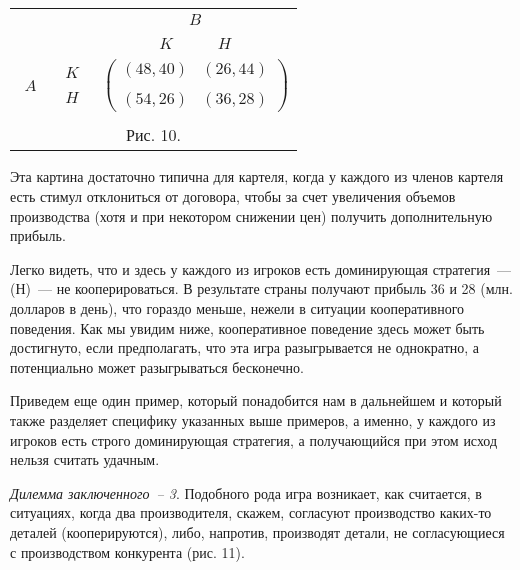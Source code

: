 \begin{center}
\begin{tabular}{ccc}
&&$\begin{array}{c} B\end{array}$\\
&&$\begin{array}{cc}  K\quad &\quad H \end{array}$\\
$\begin{array}{c} \\ A \\ \end{array}$& $\begin{array}{c} K\\ \\ H
\end{array}$&
$\left(\begin{array}{cc} (48,40)& (26,44)\\
\\
(54,26)&(36,28)\end{array}\right)$\\
\multicolumn{3}{c}{}\\
\multicolumn{3}{c}{Рис. 10.}\\
\end{tabular}
\end{center}

Эта картина достаточно типична для картеля, когда у каждого из
членов картеля есть стимул отклониться от договора, чтобы за счет
увеличения объемов производства (хотя и при некотором снижении
цен) получить дополнительную прибыль.

Легко видеть, что и здесь у каждого из игроков есть доминирующая
стратегия~--- (Н)~--- не кооперироваться. В результате страны
получают прибыль 36 и 28 (млн. долларов в день), что гораздо меньше,
нежели в ситуации кооперативного поведения. Как мы увидим ниже,
кооперативное поведение здесь может быть достигнуто, если
предполагать, что эта игра разыгрывается не однократно, а
потенциально может разыгрываться бесконечно.

Приведем еще один пример, который понадобится нам в дальнейшем и
который также разделяет специфику указанных выше примеров, а
именно, у каждого из игроков есть строго доминирующая стратегия, а
получающийся при этом исход нельзя считать удачным.

{\it Дилемма заключенного~-- 3}. Подобного рода игра возникает, как
считается, в ситуациях, когда два производителя, скажем, согласуют
производство каких-то деталей (кооперируются), либо, напротив,
производят детали, не согласующиеся с производством конкурента (рис. 11).

